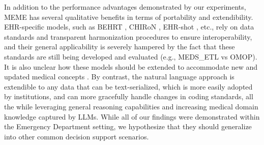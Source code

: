 \documentclass{article}
\theoremstyle{plain}
\theoremstyle{definition}
\theoremstyle{remark}
\begin{document}
{{In addition to the performance advantages demonstrated by our experiments, MEME has several qualitative benefits in terms of portability and extendibility. EHR-specific models, such as BEHRT \citep{li_behrt_2020}, CHIRoN \citep{hill2023chiron}, EHR-shot \citep{wornow2024ehrshot}, etc., rely on data standards and transparent harmonization procedures to ensure interoperability, and their general applicability is severely hampered by the fact that these standards are still being developed and evaluated (e.g., MEDS\_ETL vs OMOP). It is also unclear how these models should be extended to accommodate new and updated medical concepts \citep{arnrich2024medical}. By contrast, the natural language approach is extendible to any data that can be text-serialized, which is more easily adopted by institutions, and can more gracefully handle changes in coding standards, all the while leveraging general reasoning capabilities and increasing medical domain knowledge captured by LLMs. While all of our findings were demonstrated within the Emergency Department setting, we hypothesize that they should generalize into other common decision support scenarios.}




}
\end{document}
